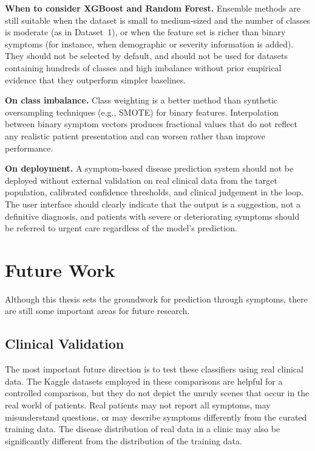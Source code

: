 \textbf{When to consider XGBoost and Random Forest.} Ensemble methods are still suitable when the dataset is small to medium-sized and the number of classes is moderate (as in Dataset~1), or when the feature set is richer than binary symptoms (for instance, when demographic or severity information is added). They should not be selected by default, and should not be used for datasets containing hundreds of classes and high imbalance without prior empirical evidence that they outperform simpler baselines.

\textbf{On class imbalance.} Class weighting is a better method than synthetic oversampling techniques (e.g., SMOTE) for binary features. Interpolation between binary symptom vectors produces fractional values that do not reflect any realistic patient presentation and can worsen rather than improve performance.

\textbf{On deployment.} A symptom-based disease prediction system should not be deployed without external validation on real clinical data from the target population, calibrated confidence thresholds, and clinical judgement in the loop. The user interface should clearly indicate that the output is a suggestion, not a definitive diagnosis, and patients with severe or deteriorating symptoms should be referred to urgent care regardless of the model's prediction.

\section{Future Work}
\label{sec:future_work}

Although this thesis sets the groundwork for prediction through symptoms, there are still some important areas for future research.

\subsection{Clinical Validation}

The most important future direction is to test these classifiers using real clinical data. The Kaggle datasets employed in these comparisons are helpful for a controlled comparison, but they do not depict the unruly scenes that occur in the real world of patients. Real patients may not report all symptoms, may misunderstand questions, or may describe symptoms differently from the curated training data. The disease distribution of real data in a clinic may also be significantly different from the distribution of the training data.

